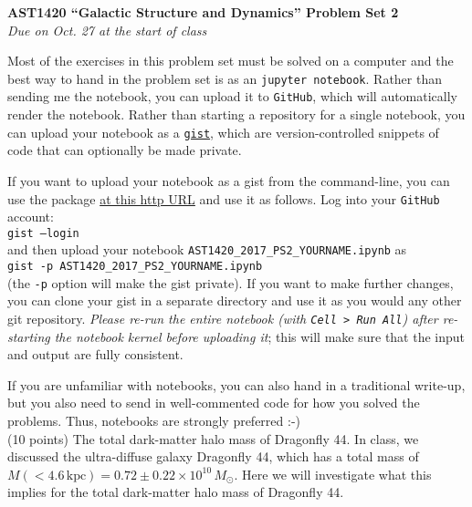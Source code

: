 \documentclass[12pt]{article}
\begin{document}
\begin{center}
{\bf \LARGE AST1420 ``Galactic Structure and Dynamics'' Problem Set 2}\\[7pt]
\emph{Due on Oct. 27 at the start of class}\\[7pt]
\end{center}

Most of the exercises in this problem set must be solved on a computer
and the best way to hand in the problem set is as an \texttt{jupyter
  notebook}. Rather than sending me the notebook, you can upload it to
\texttt{GitHub}, which will automatically render the notebook. Rather
than starting a repository for a single notebook, you can upload your
notebook as a \texttt{\href{https://gist.github.com/}{gist}}, which
are version-controlled snippets of code that can optionally be made
private.

If you want to upload your notebook as a gist from the command-line,
you can use the package \href{http://github.com/defunkt/gist}{at this
  http URL} and use it as follows. Log into your \texttt{GitHub}
account:\\

\texttt{gist --login}\\

and then upload your notebook
\texttt{AST1420\_2017\_PS2\_YOURNAME.ipynb} as\\

\texttt{gist -p AST1420\_2017\_PS2\_YOURNAME.ipynb}\\

(the \texttt{-p} option will make the gist private). If you want to
make further changes, you can clone your gist in a separate directory
and use it as you would any other git repository. \emph{Please re-run
  the entire notebook (with \texttt{Cell > Run All}) after re-starting
  the notebook kernel before uploading it}; this will make sure that
the input and output are fully consistent. 

If you are unfamiliar with notebooks, you can also hand in a
traditional write-up, but you also need to send in well-commented code
for how you solved the problems. Thus, notebooks are strongly
preferred :-)\\

 (10 points) The total dark-matter halo mass
of Dragonfly 44. In class, we discussed the ultra-diffuse galaxy
Dragonfly 44, which has a total mass of $M(<4.6\,\mathrm{kpc}) =
0.72\pm0.22\times10^{10}\,M_\odot$. Here we will investigate what this
implies for the total dark-matter halo mass of Dragonfly 44.\\
\end{document}

